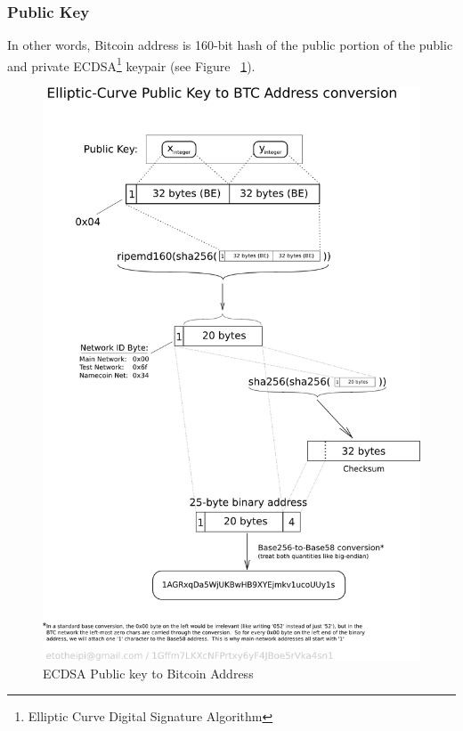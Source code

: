\subsubsection{Public Key}
 In other words, Bitcoin address is 160-bit hash of the public portion of the public and private ECDSA\footnote{Elliptic Curve Digital Signature Algorithm} keypair (see Figure ~\ref{fig:pubkeytoaddr}).

\begin{figure}[h]
\centering
\includegraphics[scale=1]{fig/PubKeyToAddr.png}
  \caption{ECDSA Public key to Bitcoin Address}
\label{fig:pubkeytoaddr}
\end{figure}


